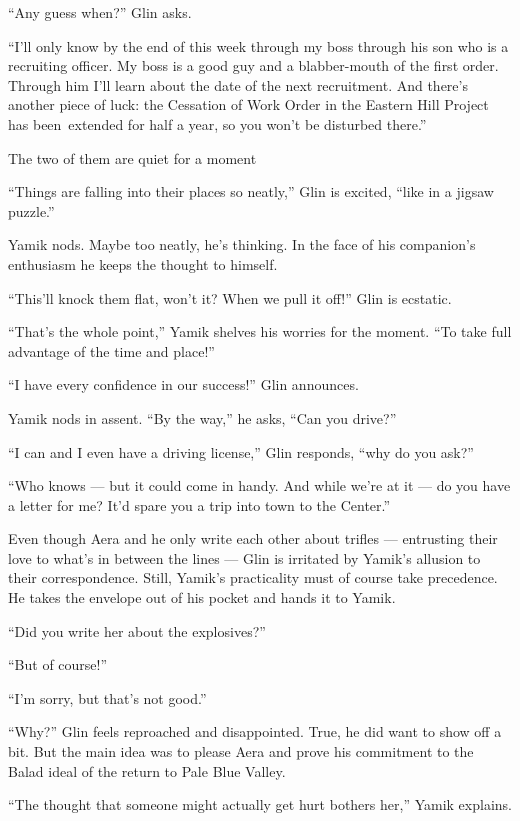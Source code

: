 \documentclass[twoside,11pt,openany]{book}
\begin{document}
``Any guess when?'' Glin asks.

``I'll only know by the end of this week through my boss through his son who is a recruiting officer. My
boss is a good guy and a blabber-mouth of the first order. Through him I'll learn about the date of the next
recruitment. And there's another piece of luck: the Cessation of Work Order in the Eastern Hill Project has
been~extended for half a year, so you won't be disturbed there.''

The two of them are quiet for a moment

``Things are falling into their places so neatly,'' Glin is excited, ``like in a
jigsaw puzzle.''

Yamik nods. Maybe too neatly, he's thinking. In the face of his companion's enthusiasm he keeps the thought to himself.

{}``This'll knock them flat, won't it? When we pull it off!'' Glin is ecstatic.

``That's the whole point,'' Yamik shelves his worries for the moment. ``To take
full advantage of the time and place!''

``I have every confidence in our success!'' Glin announces.

Yamik nods in assent. ``By the way,'' he asks, ``Can you drive?''

``I can and I even have a driving license,'' Glin responds, ``why do you
ask?''

``Who knows --- but it could come in handy. And while we're at it --- do you have a letter for me? It'd spare you a
trip into town to the Center.''

Even though Aera and he only write each other about trifles --- entrusting their love to what's in between the lines ---
Glin is irritated by Yamik's allusion to their correspondence. Still, Yamik's practicality must of course take
precedence.  He takes the envelope out of his pocket and hands it to Yamik.

``Did you write her about the explosives?''

``But of course!''

``I'm sorry, but that's not good.''

``Why?'' Glin feels reproached and disappointed. True, he did want to show off a bit. But the
main idea was to please Aera and prove his commitment to the Balad ideal of the return to Pale Blue Valley.

``The thought that someone might actually get hurt bothers her,'' Yamik explains.
\end{document}
